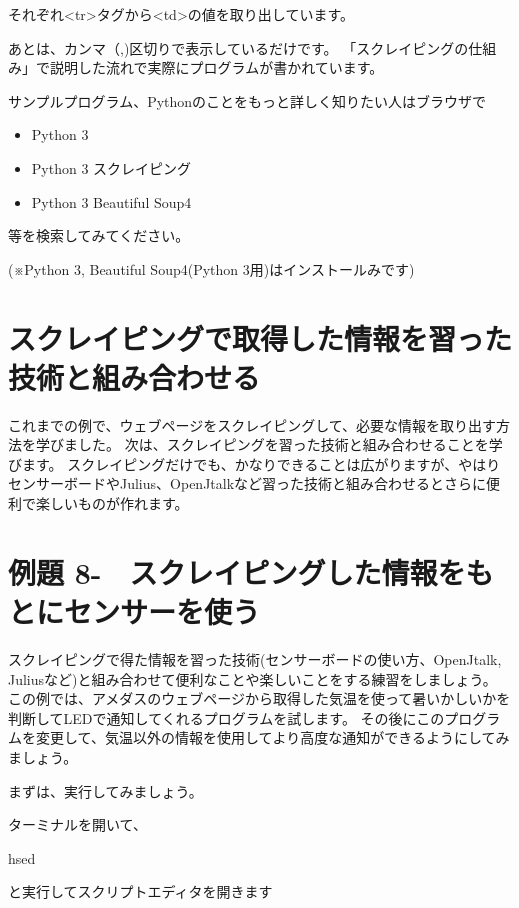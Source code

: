 \documentclass[a4paper,12pt,dvipdfmx]{jarticle}
\newcounter{Exercise}
\renewcommand\theExercise{例題 8-\arabic{Exercise}}
\begin{document}
それぞれ{\textless}tr{\textgreater}タグから{\textless}td{\textgreater}の値を取り出しています。


あとは、カンマ（,)区切りで表示しているだけです。
「スクレイピングの仕組み」で説明した流れで実際にプログラムが書かれています。



\bigskip


\bigskip

サンプルプログラム、Pythonのことをもっと詳しく知りたい人はブラウザで

\begin{itemize}
\item Python 3
\item Python 3 スクレイピング
\item Python 3 Beautiful Soup4
\end{itemize}
等を検索してみてください。


(※Python 3, Beautiful Soup4(Python
3用)はインストールみです)


\bigskip

\clearpage\section{スクレイピングで取得した情報を習った技術と組み合わせる}
これまでの例で、ウェブページをスクレイピングして、必要な情報を取り出す方法を学びました。
次は、スクレイピングを習った技術と組み合わせることを学びます。
スクレイピングだけでも、かなりできることは広がりますが、やはりセンサーボードやJulius、OpenJtalkなど習った技術と組み合わせるとさらに便利で楽しいものが作れます。

\clearpage\section{\theExercise　スクレイピングした情報をもとにセンサーを使う}
スクレイピングで得た情報を習った技術(センサーボードの使い方、OpenJtalk,
Juliusなど)と組み合わせて便利なことや楽しいことをする練習をしましょう。
この例では、アメダスのウェブページから取得した気温を使って暑いかしいかを判断してLEDで通知してくれるプログラムを試します。
その後にこのプログラムを変更して、気温以外の情報を使用してより高度な通知ができるようにしてみましょう。

まずは、実行してみましょう。

ターミナルを開いて、

hsed

と実行してスクリプトエディタを開きます
\end{document}
